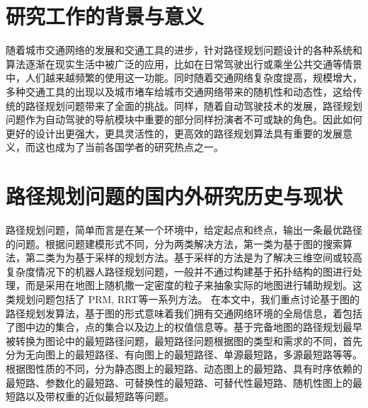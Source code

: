 \documentclass{standalone}
\begin{document}
\thesischapterexordium

\section{研究工作的背景与意义}
随着城市交通网络的发展和交通工具的进步，针对路径规划问题设计的各种系统和算法逐渐在现实生活中被广泛的应用，比如在日常驾驶出行或乘坐公共交通等情景中，人们越来越频繁的使用这一功能。同时随着交通网络复杂度提高，规模增大，多种交通工具的出现以及城市堵车给城市交通网络带来的随机性和动态性，这给传统的路径规划问题带来了全面的挑战。同样，随着自动驾驶技术的发展，路径规划问题作为自动驾驶的导航模块中重要的部分同样扮演者不可或缺的角色。因此如何更好的设计出更强大，更具灵活性的，更高效的路径规划算法具有重要的发展意义，而这也成为了当前各国学者的研究热点之一。


\section{路径规划问题的国内外研究历史与现状}
路径规划问题，简单而言是在某一个环境中，给定起点和终点，输出一条最优路径的问题。根据问题建模形式不同，分为两类解决方法，第一类为基于图的搜索算法，第二类为为基于采样的规划方法。基于采样的方法是为了解决三维空间或较高复杂度情况下的机器人路径规划问题，一般并不通过构建基于拓扑结构的图进行处理，而是采用在地图上随机撒一定密度的粒子来抽象实际的地图进行辅助规划。这类规划问题包括了 PRM, RRT等一系列方法。
在本文中，我们重点讨论基于图的路径规划发算法，基于图的形式意味着我们拥有交通网络环境的全局信息，着包括了图中边的集合，点的集合以及边上的权值信息等。基于完备地图的路径规划最早被转换为图论中的最短路径问题，最短路径问题根据图的类型和需求的不同，首先分为无向图上的最短路径、有向图上的最短路径、单源最短路，多源最短路等等。根据图性质的不同，分为静态图上的最短路、动态图上的最短路、具有时序依赖的最短路、参数化的最短路、可替换性的最短路、可替代性最短路、随机性图上的最短路以及带权重的近似最短路等问题。\par
\end{document}
